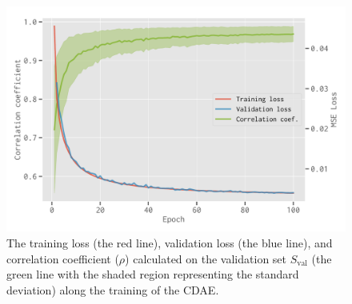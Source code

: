\documentclass[fleqn,usenatbib]{mnras}
\newlength{\myfigwidth}
\newcommand{\R}[1]{\mathrm{#1}}
\begin{document}
\begin{figure}
  \centering
  \includegraphics[width=\myfigwidth]{cdae-train}
  \caption{\label{fig:train}%
    The training loss (the red line), validation loss (the blue line),
    and correlation coefficient ($\rho$) calculated on the validation
    set $S_{\R{val}}$ (the green line with the shaded region representing
    the standard deviation) along the training of the CDAE.
  }
\end{figure}
\end{document}
